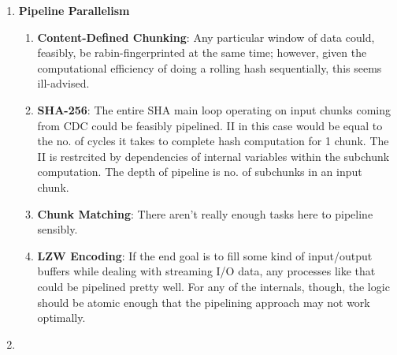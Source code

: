 \documentclass{article}
\begin{document}
\begin{enumerate}
\begin{enumerate}[label=(\alph*)]
\item%
\textbf{Pipeline Parallelism}
\begin{enumerate}[label=(\roman*)]
\item%
\textbf{Content-Defined Chunking}:\newline
Any particular window of data could, feasibly, be rabin-fingerprinted at the same time; however, given the computational efficiency of doing a rolling hash sequentially, this seems ill-advised.
\item%
\textbf{SHA-256}:\newline
The entire SHA main loop operating on input chunks coming from CDC could be feasibly pipelined. II in this case would be equal to the no. of cycles it takes to complete hash computation for 1 chunk. The II is restrcited by dependencies of internal
variables within the subchunk computation. The depth of pipeline is no. of subchunks in an input chunk. 
\item%
\textbf{Chunk Matching}:\newline
There aren't really enough tasks here to pipeline sensibly.

\item%
\textbf{LZW Encoding}:\newline
If the end goal is to fill some kind of input/output buffers while dealing with streaming I/O data, any processes like that could be pipelined pretty well. For any of the internals, though, the logic should be atomic enough that the pipelining approach may not work optimally.

\end{enumerate}%

\item%

\end{enumerate}%


\end{enumerate}
\end{document}
